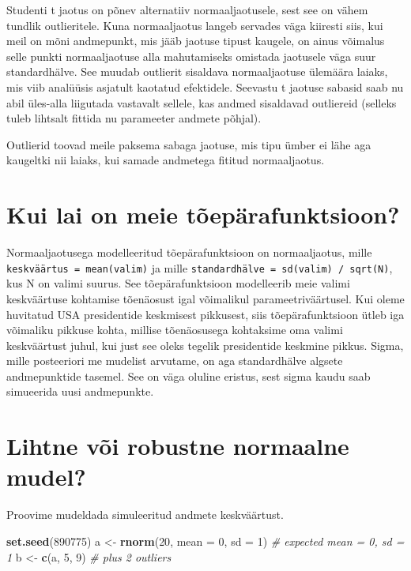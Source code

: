 \documentclass[]{book}
\newenvironment{Shaded}{\begin{snugshade}}{\end{snugshade}}
\newcommand{\CommentTok}[1]{\textcolor[rgb]{0.56,0.35,0.01}{\textit{#1}}}
\newcommand{\DataTypeTok}[1]{\textcolor[rgb]{0.13,0.29,0.53}{#1}}
\newcommand{\DecValTok}[1]{\textcolor[rgb]{0.00,0.00,0.81}{#1}}
\newcommand{\KeywordTok}[1]{\textcolor[rgb]{0.13,0.29,0.53}{\textbf{#1}}}
\newcommand{\NormalTok}[1]{#1}
\newcommand{\StringTok}[1]{\textcolor[rgb]{0.31,0.60,0.02}{#1}}
\begin{document}
Studenti t jaotus on põnev alternatiiv normaaljaotusele, sest see on vähem tundlik outlieritele.
Kuna normaaljaotus langeb servades väga kiiresti siis, kui meil on mõni andmepunkt, mis jääb jaotuse tipust kaugele, on ainus võimalus selle punkti normaaljaotuse alla mahutamiseks omistada jaotusele väga suur standardhälve.
See muudab outlierit sisaldava normaaljaotuse ülemäära laiaks, mis viib analüüsis asjatult kaotatud efektidele.
Seevastu t jaotuse sabasid saab nu abil üles-alla liigutada vastavalt sellele, kas andmed sisaldavad outliereid (selleks tuleb lihtsalt fittida nu parameeter andmete põhjal).

Outlierid toovad meile paksema sabaga jaotuse, mis tipu ümber ei lähe aga kaugeltki nii laiaks, kui samade andmetega fititud normaaljaotus.

\hypertarget{kui-lai-on-meie-toeparafunktsioon}{%
\section*{Kui lai on meie tõepärafunktsioon?}\label{kui-lai-on-meie-toeparafunktsioon}}

Normaaljaotusega modelleeritud tõepärafunktsioon on normaaljaotus, mille \texttt{keskväärtus\ =\ mean(valim)} ja mille \texttt{standardhälve\ =\ sd(valim)\ /\ sqrt(N)}, kus N on valimi suurus.
See tõepärafunktsioon modelleerib meie valimi keskväärtuse kohtamise tõenäosust igal võimalikul parameetriväärtusel.
Kui oleme huvitatud USA presidentide keskmisest pikkusest, siis tõepärafunktsioon ütleb iga võimaliku pikkuse kohta, millise tõenäosusega kohtaksime oma valimi keskväärtust juhul, kui just see oleks tegelik presidentide keskmine pikkus.
Sigma, mille posteeriori me mudelist arvutame, on aga standardhälve algsete andmepunktide tasemel.
See on väga oluline eristus, sest sigma kaudu saab simueerida uusi andmepunkte.

\hypertarget{lihtne-voi-robustne-normaalne-mudel}{%
\section*{Lihtne või robustne normaalne mudel?}\label{lihtne-voi-robustne-normaalne-mudel}}

Proovime mudeldada simuleeritud andmete keskväärtust.

\begin{Shaded}
\begin{Highlighting}[]
\KeywordTok{set.seed}\NormalTok{(}\DecValTok{890775}\NormalTok{)}
\NormalTok{a <-}\StringTok{ }\KeywordTok{rnorm}\NormalTok{(}\DecValTok{20}\NormalTok{, }\DataTypeTok{mean =} \DecValTok{0}\NormalTok{, }\DataTypeTok{sd =} \DecValTok{1}\NormalTok{) }\CommentTok{# expected mean = 0, sd = 1}
\NormalTok{b <-}\StringTok{ }\KeywordTok{c}\NormalTok{(a, }\DecValTok{5}\NormalTok{, }\DecValTok{9}\NormalTok{) }\CommentTok{# plus 2 outliers}
\end{Highlighting}
\end{Shaded}
\end{document}
